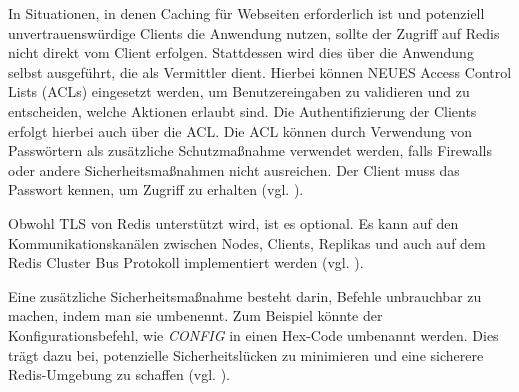In Situationen, in denen Caching für Webseiten erforderlich ist und potenziell unvertrauenswürdige Clients die Anwendung nutzen, sollte der Zugriff auf Redis nicht direkt vom Client erfolgen. Stattdessen wird dies über die Anwendung selbst ausgeführt, die als Vermittler dient.
Hierbei können NEUES Access Control Lists (ACLs) eingesetzt werden, um Benutzereingaben zu validieren und zu entscheiden, welche Aktionen erlaubt sind. Die Authentifizierung der Clients erfolgt hierbei auch über die ACL.
Die ACL können durch Verwendung von Passwörtern als zusätzliche Schutzmaßnahme verwendet werden, falls Firewalls oder andere Sicherheitsmaßnahmen nicht ausreichen. Der Client muss das Passwort kennen, um Zugriff zu erhalten (vgl. \cite{Redis-Security}).

Obwohl TLS von Redis unterstützt wird, ist es optional. Es kann auf den Kommunikationskanälen zwischen Nodes, Clients, Replikas und auch auf dem Redis Cluster Bus Protokoll implementiert werden (vgl. \cite{Redis-Security}).

Eine zusätzliche Sicherheitsmaßnahme besteht darin, Befehle unbrauchbar zu machen, indem man sie umbenennt. Zum Beispiel könnte der Konfigurationsbefehl, wie \textit{CONFIG} in einen Hex-Code umbenannt werden. Dies trägt dazu bei, potenzielle Sicherheitslücken zu minimieren und eine sicherere Redis-Umgebung zu schaffen (vgl. \cite{Redis-Security}).
